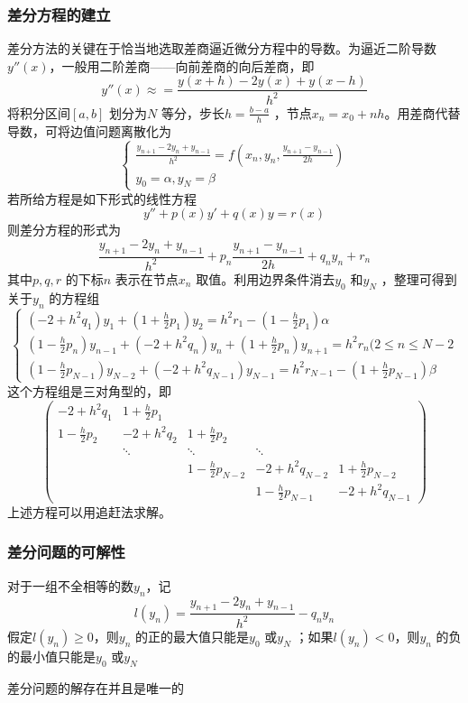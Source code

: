 \documentclass[a4paper]{article}
\begin{document}
\subsubsection{差分方程的建立}
差分方法的关键在于恰当地选取差商逼近微分方程中的导数。为逼近二阶导数$y''(x)$，一般用二阶差商——向前差商的向后差商，即
\[
y''(x) \approx = \frac{y(x+h) - 2y(x) + y(x-h)}{h^2}
\] 
将积分区间$[a,b]$ 划分为$N$ 等分，步长$h = \frac{b-a}{h}$ ，节点$x_{n} = x_0 + nh$。用差商代替导数，可将边值问题离散化为
\[
	\tag{4.7.1} \label{eq:4.7.1} 
	\begin{cases}
		\frac{y_{n+1} - 2y_{n} + y_{n-1}}{h^2} = f(x_{n}, y_{n}, \frac{y_{n+1} - y_{n-1}}{2h}) \\
		y_0 = \alpha, y_N = \beta
	\end{cases} 
\] 
若所给方程是如下形式的线性方程
\[
y'' + p(x) y' + q(x) y = r(x) \tag{4.7.2} \label{eq:4.7.2} 
\] 
则差分方程的形式为
\[
\frac{y_{n+1} - 2y_{n} + y_{n-1}}{h^2} + p_n \frac{y_{n+1} - y_{n-1}}{2h} + q_n y_{n} + r_n \tag{4.7.3} \label{eq:4.7.3} 
\] 
其中$p,q,r$ 的下标$n$ 表示在节点$x_{n}$ 取值。利用边界条件消去$y_0$ 和$y_N$ ，整理可得到关于$y_{n}$ 的方程组
\[
	\tag{4.7.4} \label{eq:4.7.4} 
\begin{cases}
	(-2 + h^2 q_1) y_1 + (1 + \frac{h}{2} p_1) y_2 = h^2 r_1 - (1 - \frac{h}{2} p_1) \alpha \\
	(1 - \frac{h}{2}p_n) y_{n-1} + (-2 + h^2 q_n) y_{n} + (1 + \frac{h}{2} p_n) y_{n+1} = h^2 r_n (2 \le n \le N-2 \\
	(1 - \frac{h}{2} p_{N-1}) y_{N-2} + (-2 + h^2 q_{N-1}) y_{N-1} = h^2 r_{N-1} - (1 + \frac{h}{2} p_{N-1}) \beta
\end{cases} 
\] 
这个方程组是三对角型的，即
\[
	\begin{pmatrix} 
		-2 + h^2 q_1 & 1 + \frac{h}{2} p_1 & & & \\
		1 - \frac{h}{2} p_2 & -2 + h^2 q_2 & 1 + \frac{h}{2} p_2 & & \\
				    & \ddots & \ddots & \ddots & \\
				    & & 1 - \frac{h}{2} p_{N-2} & -2 + h^2 q_{N-2} & 1 + \frac{h}{2} p_{N-2} \\
				    & & & 1 - \frac{h}{2} p_{N-1} & -2 + h^2 q_{N-1}
	\end{pmatrix} 
\] 
上述方程可以用追赶法求解。

\subsubsection{差分问题的可解性}
\begin{theorem}
	对于一组不全相等的数$y_{n}$，记
	\[
	l(y_{n}) = \frac{y_{n+1} - 2 y_{n} + y_{n-1}}{h^2} - q_n y_{n}
	\] 
	假定$l(y_{n}) \ge 0$，则$y_{n}$ 的正的最大值只能是$y_0$ 或$y_N$ ；如果$l(y_{n}) < 0$，则$y_{n}$ 的负的最小值只能是$y_0$ 或$y_N$
\end{theorem}
\begin{theorem}
	差分问题的解存在并且是唯一的
\end{theorem}
\end{document}
